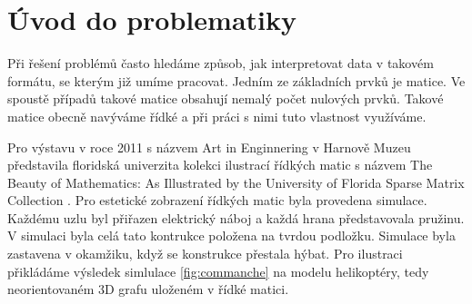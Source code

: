 \chapter{Úvod do problematiky}

Při řešení problémů často hledáme způsob, jak interpretovat data v takovém formátu, se kterým již umíme pracovat. Jedním ze základních prvků je matice. Ve spoustě případů takové matice obsahují nemalý počet nulových prvků. Takové matice obecně navýváme řídké a při práci s nimi tuto vlastnost využíváme.


Pro výstavu v roce 2011 s názvem Art in Enginnering v Harnově Muzeu představila floridská univerzita kolekci ilustrací řídkých matic s názvem The Beauty of Mathematics: As Illustrated by the University of Florida Sparse Matrix Collection \cite{Davis:2011:UFS:2049662.2049663}. Pro estetické zobrazení řídkých matic byla provedena simulace. Každému uzlu byl přiřazen elektrický náboj a každá hrana představovala pružinu. V simulaci byla celá tato kontrukce položena na tvrdou podložku. Simulace byla zastavena v okamžiku, když se konstrukce přestala hýbat. Pro ilustraci přikládáme výsledek simlulace \ref{fig:commanche} na modelu helikoptéry, tedy neorientovaném 3D grafu uloženém v řídké matici.

